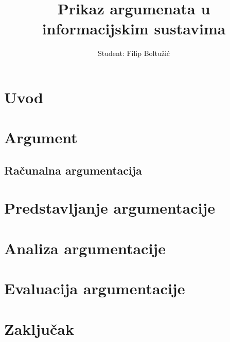 \documentclass[times, utf8, seminar]{fer}
\begin{document}
\title{Prikaz argumenata u informacijskim sustavima}
% 
\author{Student: Filip Boltužić}
% 

\maketitle
 
\tableofcontents
 
\chapter{Uvod} 

 
\chapter{Argument} 
\label{chap:arg}

 
\section{Računalna argumentacija} 
\label{chap:rac_arg}


\chapter{Predstavljanje argumentacije}
\label{chap:aif}


\chapter{Analiza argumentacije}
\label{chap:analysis}


\chapter{Evaluacija argumentacije}
\label{chap:eval}


\chapter{Zaključak} 


 
\end{document}
